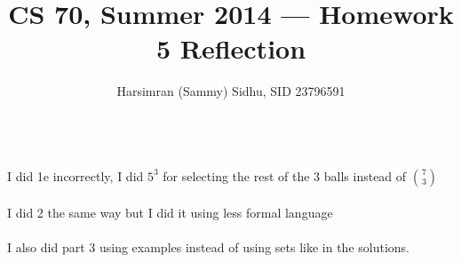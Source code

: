 \documentclass[11pt,letterpaper]{article}
\title{CS 70, Summer 2014 --- Homework 5 Reflection} %
\author{Harsimran (Sammy) Sidhu, SID 23796591} %
\begin{document}
\maketitle
~\\
I did 1e incorrectly, I did $5^3$ for selecting the rest of the 3 balls instead of ${7\choose 3}$\\\\
I did 2 the same way but I did it using less formal language\\\\
I also did part 3 using examples instead of using sets like in the solutions.\\\\
\end{document}
